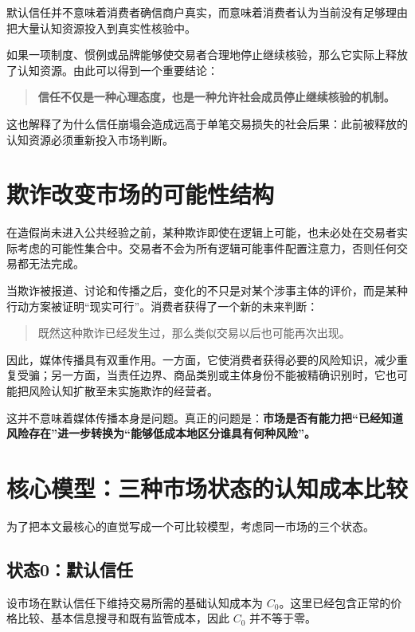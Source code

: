 \documentclass[UTF8,12pt]{ctexart}
\begin{document}
默认信任并不意味着消费者确信商户真实，而意味着消费者认为当前没有足够理由把大量认知资源投入到真实性核验中。

如果一项制度、惯例或品牌能够使交易者合理地停止继续核验，那么它实际上释放了认知资源。由此可以得到一个重要结论：

\begin{quote}
\textbf{信任不仅是一种心理态度，也是一种允许社会成员停止继续核验的机制。}
\end{quote}

这也解释了为什么信任崩塌会造成远高于单笔交易损失的社会后果：此前被释放的认知资源必须重新投入市场判断。

\section{欺诈改变市场的可能性结构}

在造假尚未进入公共经验之前，某种欺诈即使在逻辑上可能，也未必处在交易者实际考虑的可能性集合中。交易者不会为所有逻辑可能事件配置注意力，否则任何交易都无法完成。

当欺诈被报道、讨论和传播之后，变化的不只是对某个涉事主体的评价，而是某种行动方案被证明“现实可行”。消费者获得了一个新的未来判断：

\begin{quote}
既然这种欺诈已经发生过，那么类似交易以后也可能再次出现。
\end{quote}

因此，媒体传播具有双重作用。一方面，它使消费者获得必要的风险知识，减少重复受骗；另一方面，当责任边界、商品类别或主体身份不能被精确识别时，它也可能把风险认知扩散至未实施欺诈的经营者。

这并不意味着媒体传播本身是问题。真正的问题是：\textbf{市场是否有能力把“已经知道风险存在”进一步转换为“能够低成本地区分谁具有何种风险”。}

\section{核心模型：三种市场状态的认知成本比较}

为了把本文最核心的直觉写成一个可比较模型，考虑同一市场的三个状态。

\subsection{状态0：默认信任}

设市场在默认信任下维持交易所需的基础认知成本为 $C_0$。这里已经包含正常的价格比较、基本信息搜寻和既有监管成本，因此 $C_0$ 并不等于零。
\end{document}
